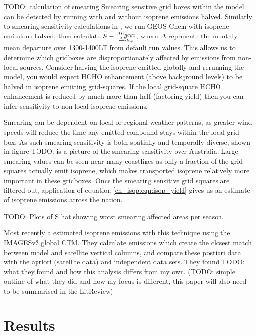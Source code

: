     TODO: calculation of smearing
    Smearing sensitive grid boxes within the model can be detected by running with and without isoprene emissions halved.
    Similarly to smearing sensitivity calculations in \textcite{Marais2012}, we run GEOS-Chem with isoprene emissions halved, then calculate $\hat{S} = \frac{\Delta \Omega_{HCHO}}{\Delta E_{Isop}} $, where $\Delta$ represents the monthly mean departure over 1300-1400LT from default run values.
    This allows us to determine which gridboxes are disproportionately affected by emissions from non-local sources.
    Consider halving the isoprene emitted globally and rerunning the model, you would expect HCHO enhancement (above background levels) to be halved in isoprene emitting grid-squares.
    If the local grid-square HCHO enhancement is reduced by much more than half (factoring yield) then you can infer sensitivity to non-local isoprene emissions.
    
    Smearing can be dependent on local or regional weather patterns, as greater wind speeds will reduce the time any emitted compound stays within the local grid box.
    As such smearing sensitivity is both spatially and temporally diverse, shown in figure TODO: is a picture of the smearing sensitivity over Australia.
    Large smearing values can be seen near many coastlines as only a fraction of the grid squares actually emit isoprene, which makes transported isoprene relatively more important in these gridboxes.
    Once the smearing sensitive grid squares are filtered out, application of equation \ref{ch_isop:eqn:isop_yield} gives us an estimate of isoprene emissions across the nation.
    
    TODO: Plots of S hat showing worst smearing affected areas per season.
    
    Most recently a \textcite{Bauwens2016} estimated isoprene emissions with this technique using the IMAGESv2 global CTM.
    They calculate emissions which create the closest match between model and satellite vertical columns, and compare these postiori data with the apriori (satellite data) and independent data sets.
    They found TODO: what they found and how this analysis differs from my own.
    (TODO: simple outline of what they did and how my focus is different, this paper will also need to be summarised in the LitReview)
    
    
    
\section{Results}
  \label{BioIsop:Results}
  
